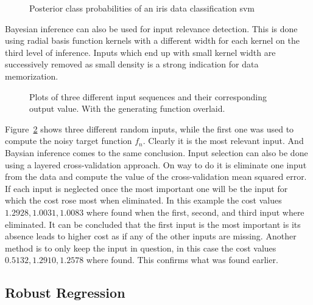 \begin{figure}
\centering

\caption{Posterior class probabilities of an iris data classification svm}
\label{fig:bayesianClass}
\end{figure}
Bayesian inference can also be used for input relevance detection. This is done using radial basis function kernels with a different width for each kernel on the third level of inference. Inputs which end up with small kernel width are successively removed as small density is a strong indication for data memorization. 
\begin{figure}
\centering



\caption{Plots of three different input sequences and their corresponding output value. With the generating function overlaid.}
\label{fig:AIDBayes}
\end{figure}
Figure~\ref{fig:AIDBayes} shows three different random inputs, while the first one was used to compute the noisy target function $f_n$. Clearly it is the most relevant input. And Baysian inference comes to the same conclusion.
Input selection can also be done using a layered cross-validation approach. On way to do it is eliminate one input from the data and compute the value of the cross-validation mean squared error. If each input is neglected once the most important one will be the input for which the cost rose most when eliminated. In this example the cost values $1.2928, 1.0031,  1.0083$ where found when the first, second, and third input where eliminated. It can be concluded that the first input is the most important is its absence leads to higher cost as if any of the other inputs are missing. Another method is to only keep the input in question, in this case the cost values $0.5132, 1.2910, 1.2578$ where found. This confirms what was found earlier. 

\subsection{Robust Regression}



